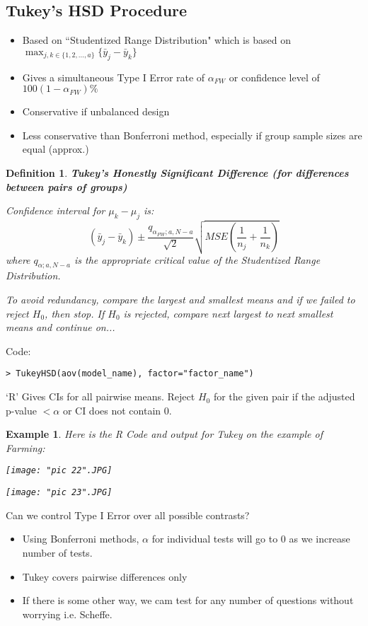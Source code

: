 \documentclass[a4paper,11pt]{article}
\newtheorem{defn}[thm]{Definition}
\newtheorem{eg}[thm]{Example}
\begin{document}
\subsection{Tukey's HSD Procedure}
\begin{itemize}
\item Based on ``Studentized Range Distribution" which is based on $\max_{j,k\in\{1,2,...,a\}}\{\bar{y}_j-\bar{y}_k\}$
\item Gives a simultaneous Type I Error rate of $\alpha_{FW}$ or confidence level of $100(1-\alpha_{FW})\%$
\item Conservative if unbalanced design
\item Less conservative than Bonferroni method, especially if group sample sizes are equal (approx.)
\end{itemize}
\begin{defn}
\normalfont
\textbf{Tukey's Honestly Significant Difference (for differences between pairs of groups)}

Confidence interval for $\mu_k-\mu_j$ is:
$$(\bar{y}_j-\bar{y}_k)\pm \frac{q_{\alpha_{FW};a,N-a}}{\sqrt{2}}\sqrt{MSE(\frac{1}{n_j}+\frac{1}{n_k})}$$
where $q_{\alpha;a,N-a}$ is the appropriate critical value of the Studentized Range Distribution. 

To avoid redundancy, compare the largest and smallest means and if we failed to reject $H_0$, then stop. If $H_0$ is rejected, compare next largest to next smallest means and continue on...
\end{defn}
Code: 
\begin{lstlisting}
> TukeyHSD(aov(model_name), factor="factor_name")
\end{lstlisting}
`R' Gives CIs for all pairwise means. Reject $H_0$ for the given pair if the adjusted p-value $<\alpha$ or CI does not contain 0.
\newpage
\begin{eg}
\normalfont
Here is the R Code and output for Tukey on the example of Farming: 

\begin{center}
	\texttt{[image: "pic 22".JPG]}
\end{center}

\begin{center}
	\texttt{[image: "pic 23".JPG]}
\end{center}
\end{eg}
\newpage
Can we control Type I Error over all possible contrasts?
\begin{itemize}
\item Using Bonferroni methods, $\alpha$ for individual tests will go to 0 as we increase number of tests.
\item Tukey covers pairwise differences only
\item If there is some other way, we cam test for any number of questions without worrying i.e. Scheffe.
\end{itemize}
\end{document}
